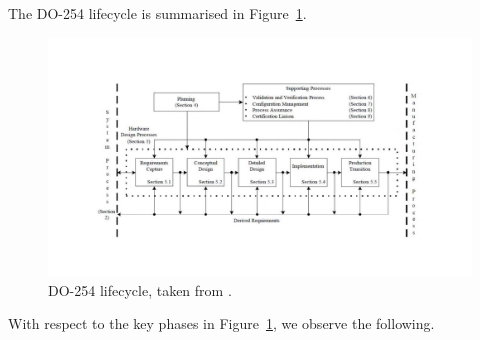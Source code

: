 \documentclass{llncs}
\begin{document}
The DO-254 lifecycle is summarised in Figure~\ref{fig:DO254}.

\begin{figure}[htbp]
	\vspace*{-2em}
	\centering
	\includegraphics[width=1.1\linewidth]{DO254.pdf}
	
	\caption{DO-254 lifecycle, taken from \cite{DO254}.}
	\label{fig:DO254}
	
	\vspace*{-2em}
\end{figure}

With respect to the key phases in Figure~\ref{fig:DO254}, we observe the following.
\end{document}
